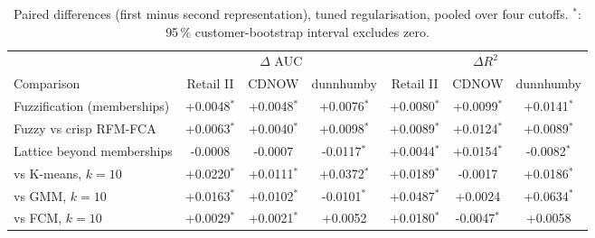 \begin{table}[t]
\centering\footnotesize
\caption{Paired differences (first minus second representation), tuned regularisation, pooled over four cutoffs. $^{*}$: 95\,\% customer-bootstrap interval excludes zero.}
\label{tab:comparisons}
\begin{tabular}{lcccccc}
\toprule
 & \multicolumn{3}{c}{$\Delta$ AUC} & \multicolumn{3}{c}{$\Delta R^2$} \\
\cmidrule(lr){2-4}\cmidrule(lr){5-7}
Comparison & Retail II & CDNOW & dunnhumby & Retail II & CDNOW & dunnhumby \\
\midrule
Fuzzification (memberships) & +0.0048$^{*}$ & +0.0048$^{*}$ & +0.0076$^{*}$ & +0.0080$^{*}$ & +0.0099$^{*}$ & +0.0141$^{*}$ \\
Fuzzy vs crisp RFM-FCA & +0.0063$^{*}$ & +0.0040$^{*}$ & +0.0098$^{*}$ & +0.0089$^{*}$ & +0.0124$^{*}$ & +0.0089$^{*}$ \\
Lattice beyond memberships & -0.0008 & -0.0007 & -0.0117$^{*}$ & +0.0044$^{*}$ & +0.0154$^{*}$ & -0.0082$^{*}$ \\
vs K-means, $k{=}10$ & +0.0220$^{*}$ & +0.0111$^{*}$ & +0.0372$^{*}$ & +0.0189$^{*}$ & -0.0017 & +0.0186$^{*}$ \\
vs GMM, $k{=}10$ & +0.0163$^{*}$ & +0.0102$^{*}$ & -0.0101$^{*}$ & +0.0487$^{*}$ & +0.0024 & +0.0634$^{*}$ \\
vs FCM, $k{=}10$ & +0.0029$^{*}$ & +0.0021$^{*}$ & +0.0052 & +0.0180$^{*}$ & -0.0047$^{*}$ & +0.0058 \\
\bottomrule
\end{tabular}
\end{table}
